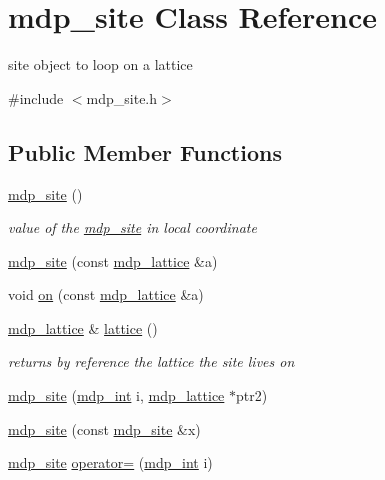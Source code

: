 \hypertarget{classmdp__site}{
\section{mdp\_\-site Class Reference}
\label{classmdp__site}
}


site object to loop on a lattice  


{\ttfamily \#include $<$mdp\_\-site.h$>$}\subsection*{Public Member Functions}
\begin{DoxyCompactItemize}
\item 
\hyperlink{classmdp__site_a9c6937993f8faf46420b724f03f3649d}{mdp\_\-site} ()
\begin{DoxyCompactList}\small\item\em value of the \hyperlink{classmdp__site}{mdp\_\-site} in local coordinate \item\end{DoxyCompactList}\item 
\hyperlink{classmdp__site_ab61e8e96573d58449ee28b9505ca799b}{mdp\_\-site} (const \hyperlink{classmdp__lattice}{mdp\_\-lattice} \&a)
\item 
void \hyperlink{classmdp__site_a6342ca7fb3edaef8b09854ca98399fa4}{on} (const \hyperlink{classmdp__lattice}{mdp\_\-lattice} \&a)
\item 
\hyperlink{classmdp__lattice}{mdp\_\-lattice} \& \hyperlink{classmdp__site_aae3a1de2fd7fafccbd1d6bd971c908c4}{lattice} ()
\begin{DoxyCompactList}\small\item\em returns by reference the lattice the site lives on \item\end{DoxyCompactList}\item 
\hyperlink{classmdp__site_a6bde992431323419da31c2ce584d7821}{mdp\_\-site} (\hyperlink{mdp__global__vars_8h_aaa1ad9d0dcd2124aa5af0120d9954174}{mdp\_\-int} i, \hyperlink{classmdp__lattice}{mdp\_\-lattice} $\ast$ptr2)
\item 
\hyperlink{classmdp__site_aa16c96d8e1013d1581df1ae3a980d272}{mdp\_\-site} (const \hyperlink{classmdp__site}{mdp\_\-site} \&x)
\item 
\hyperlink{classmdp__site}{mdp\_\-site} \hyperlink{classmdp__site_ab54108d3429bf4edb3d2434545a425c2}{operator=} (\hyperlink{mdp__global__vars_8h_aaa1ad9d0dcd2124aa5af0120d9954174}{mdp\_\-int} i)

\end{DoxyCompactItemize}

